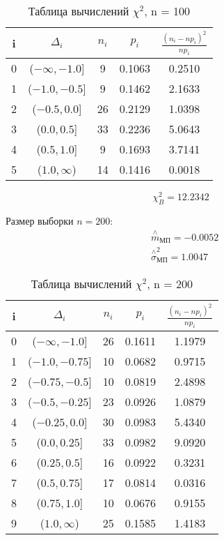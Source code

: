 \documentclass[a4]{article}
\begin{document}
\begin{table}[H]
	\caption{Таблица вычислений $\chi^2$, n = 100}
	\label{tab:my_label1}
	\begin{center}
		\vspace{5mm}
		\begin{tabular}{|c|c|c|c|c|}
			\hline
			i & $\Delta_i$ & $n_i$ & $p_i$ & $\frac{(n_i-np_i)^2}{np_i}$\\ \hline
			0&  ($-\infty ,-1.0$]&  9&  0.1063&  0.2510\\ \hline
			1&  ($-1.0,-0.5$]&  9&  0.1462&  2.1633\\ \hline
			2&  ($-0.5,0.0$]&  26&  0.2129&  1.0398\\ \hline
			3&  ($0.0,0.5$]&  33&  0.2236&  5.0643\\ \hline
			4&  ($0.5,1.0$]&  9&  0.1693&  3.7141\\ \hline
			5&  ($ 1.0,\infty$)&  14&  0.1416&  0.0018\\ \hline
		\end{tabular}
	\end{center}
\end{table}

$$\chi_B^2 = 12.2342$$ 

Размер выборки $n = 200$:
  \begin{equation}
  \begin{split}
  &\overset{\wedge}{m}_{\text{МП}} =-0.0052\\
  &  \overset{\wedge}{\sigma}^2_{\text{МП}} = 1.0047
  \end{split}
  \end{equation}

\begin{table}[H]
	\caption{Таблица вычислений $\chi^2$, n = 200}
	\label{tab:my_label1}
	\begin{center}
		\vspace{5mm}
		\begin{tabular}{|c|c|c|c|c|}
			\hline
			i & $\Delta_i$ & $n_i$ & $p_i$ & $\frac{(n_i-np_i)^2}{np_i}$\\ \hline
			0&  ($-\infty ,-1.0$]&  26&  0.1611&  1.1979\\ \hline
			1&  ($-1.0,-0.75$]&  10&  0.0682&  0.9715\\ \hline
			2&  ($-0.75,-0.5$]&  10&  0.0819&  2.4898\\ \hline
			3&  ($-0.5,-0.25$]&  23&  0.0926&  1.0879\\ \hline
			4&  ($-0.25,0.0$]&  30&  0.0983&  5.4340\\ \hline
			5&  ($0.0,0.25$]&  33&  0.0982&  9.0920\\ \hline
			6&  ($0.25,0.5$]&  16&  0.0922&  0.3231\\ \hline
			7&  ($0.5,0.75$]&  17&  0.0814&  0.0316\\ \hline
			8&  ($0.75,1.0$]&  10&  0.0676&  0.9155\\ \hline
			9&  ($ 1.0,\infty$)&  25&  0.1585&  1.4183\\ \hline
		\end{tabular}
	\end{center}
\end{table}
\end{document}
